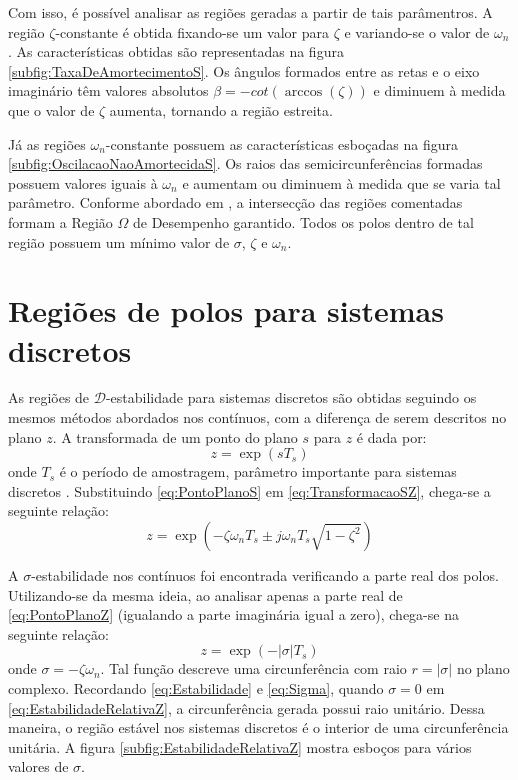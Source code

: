 Com isso, é possível analisar as regiões geradas a partir de tais parâmentros. A região $\zeta$-constante é obtida fixando-se um valor para $\zeta$ e variando-se o valor de $\omega_n$. As características obtidas são representadas na figura \ref{subfig:TaxaDeAmortecimentoS}. Os ângulos formados entre as retas e o eixo imaginário têm valores absolutos $\beta = -cot{\left(\arccos{\left(\zeta\right)}\right)}$ e diminuem à medida que o valor de $\zeta$ aumenta, tornando a região estreita.

Já as regiões $\omega_n$-constante possuem as características esboçadas na figura \ref{subfig:OscilacaoNaoAmortecidaS}. Os raios das semicircunferências formadas possuem valores iguais à $\omega_n$ e aumentam ou diminuem à medida que se varia tal parâmetro. Conforme abordado em \cite{CHILALI1996}, a intersecção das regiões comentadas formam a Região $\Omega$ de Desempenho garantido. Todos os polos dentro de tal região possuem um mínimo valor de $\sigma$, $\zeta$ e $\omega_n$.

\section{Regiões de polos para sistemas discretos}\label{sec:DEstabilidadeZ}

As regiões de $\mathscr{D}$-estabilidade para sistemas discretos são obtidas seguindo os mesmos métodos abordados nos contínuos, com a diferença de serem descritos no plano $z$. A transformada de um ponto do plano $s$ para $z$ é dada por:
\begin{equation}
  z = \exp(sT_s)\label{eq:TransformacaoSZ}
\end{equation}
onde $T_s$ é o período de amostragem, parâmetro importante para sistemas discretos \cite{KUO1980}. Substituindo \eqref{eq:PontoPlanoS} em \eqref{eq:TransformacaoSZ}, chega-se a seguinte relação:
\begin{equation}
  z = \exp{\left(-\zeta\omega_nT_s \pm j\omega_nT_s\sqrt{1-\zeta^2}\right)}\label{eq:PontoPlanoZ}
\end{equation}

A $\sigma$-estabilidade nos contínuos foi encontrada verificando a parte real dos polos. Utilizando-se da mesma ideia, ao analisar apenas a parte real de \eqref{eq:PontoPlanoZ} (igualando a parte imaginária igual a zero), chega-se na seguinte relação:
\begin{equation}
  z = \exp{\left(-|\sigma|T_s\right)}\label{eq:EstabilidadeRelativaZ}
\end{equation}
onde $\sigma = -\zeta\omega_n$. Tal função descreve uma circunferência com raio $r = |\sigma|$ no plano complexo. Recordando \eqref{eq:Estabilidade} e \eqref{eq:Sigma}, quando $\sigma = 0$ em \eqref{eq:EstabilidadeRelativaZ}, a circunferência gerada possui raio unitário. Dessa maneira, o região estável nos sistemas discretos é o interior de uma circunferência unitária. A figura \ref{subfig:EstabilidadeRelativaZ} mostra esboços para vários valores de $\sigma$.

